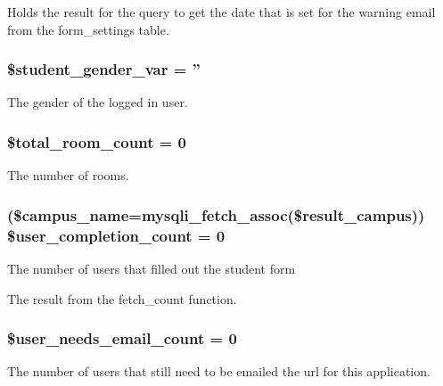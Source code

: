 \-Holds the result for the query to get the date that is set for the warning email from the form\-\_\-settings table. \hypertarget{admin__view_2index_8php_a8c73c9da0db2b0c0fa8d07057849a37e}{
\subsubsection[{\$student\-\_\-gender\-\_\-var}]{\setlength{\rightskip}{0pt plus 5cm}\$student\-\_\-gender\-\_\-var = ''}}\label{admin__view_2index_8php_a8c73c9da0db2b0c0fa8d07057849a37e}
\-The gender of the logged in user. \hypertarget{admin__view_2index_8php_afa16349167e96ad1b72ad891ac3d0b07}{
\subsubsection[{\$total\-\_\-room\-\_\-count}]{\setlength{\rightskip}{0pt plus 5cm}\$total\-\_\-room\-\_\-count = 0}}\label{admin__view_2index_8php_afa16349167e96ad1b72ad891ac3d0b07}
\-The number of rooms. \hypertarget{admin__view_2index_8php_a80ebec900a7702cc0c8558ce53366963}{
\subsubsection[{\$user\-\_\-completion\-\_\-count}]{ (\$campus\-\_\-name=mysqli\-\_\-fetch\-\_\-assoc(\$result\-\_\-campus)) \$user\-\_\-completion\-\_\-count = 0}}\label{admin__view_2index_8php_a80ebec900a7702cc0c8558ce53366963}
\-The number of users that filled out the student form

\-The result from the fetch\-\_\-count function. \hypertarget{admin__view_2index_8php_a33eb6cef4540fcb421e0cd11335798a3}{
\subsubsection[{\$user\-\_\-needs\-\_\-email\-\_\-count}]{\setlength{\rightskip}{0pt plus 5cm}\$user\-\_\-needs\-\_\-email\-\_\-count = 0}}\label{admin__view_2index_8php_a33eb6cef4540fcb421e0cd11335798a3}
\-The number of users that still need to be emailed the url for this application.

